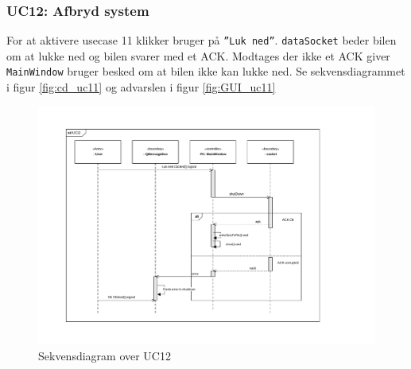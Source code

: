 \subsubsection{UC12: Afbryd system}
For at aktivere usecase 11 klikker bruger på \texttt{''Luk ned''}.
\texttt{dataSocket} beder bilen om at lukke ned og bilen svarer med et ACK. Modtages der ikke et ACK giver \texttt{MainWindow} bruger besked om at bilen ikke kan lukke ned. Se sekvensdiagrammet i figur \ref{fig:cd_uc11} og advarslen i figur \ref{fig:GUI_uc11}

\begin{figure}[H]
\centering
\includegraphics[width=\textwidth* 2/3,height=\textwidth* 4/10 ]{../fig/diagrammer/pc/sd_uc12.pdf}
\caption{Sekvensdiagram over UC12}
\label{fig:cd_uc12}
\end{figure}

